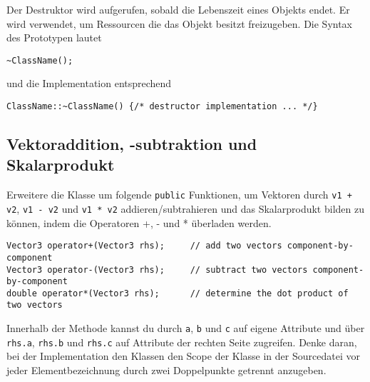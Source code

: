 Der Destruktor wird aufgerufen, sobald die Lebenszeit eines Objekts endet. Er wird verwendet, um Ressourcen die das Objekt besitzt freizugeben.
Die Syntax des Prototypen lautet
\begin{lstlisting}
~ClassName();
\end{lstlisting}
und die Implementation entsprechend
\begin{lstlisting}
ClassName::~ClassName() {/* destructor implementation ... */}
\end{lstlisting}


\subsection{Vektoraddition, -subtraktion und Skalarprodukt}
Erweitere die Klasse um folgende \texttt{public} Funktionen, um Vektoren durch \texttt{v1 + v2}, \texttt{v1 - v2} und \texttt{v1 * v2} addieren/subtrahieren und das Skalarprodukt bilden zu können, indem die Operatoren +, - und * überladen werden.

\begin{lstlisting}
Vector3 operator+(Vector3 rhs);		// add two vectors component-by-component
Vector3 operator-(Vector3 rhs);		// subtract two vectors component-by-component
double operator*(Vector3 rhs);		// determine the dot product of two vectors
\end{lstlisting}

Innerhalb der Methode kannst du durch \texttt{a}, \texttt{b} und \texttt{c} auf eigene Attribute und über  \texttt{rhs.a}, \texttt{rhs.b} und \texttt{rhs.c} auf Attribute der rechten Seite zugreifen. Denke daran, bei der Implementation den Klassen den Scope der Klasse in der Sourcedatei vor jeder Elementbezeichnung durch zwei Doppelpunkte getrennt anzugeben.

